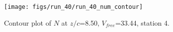 \begin{figure}[H]
\centering
\texttt{[image: figs/run\_40/run\_40\_num\_contour]}
\caption{Contour plot of $N$ at $z/c$=8.50, $V_{free}$=33.44, station 4.}
\label{fig:run_40_num_contour}
\end{figure}


